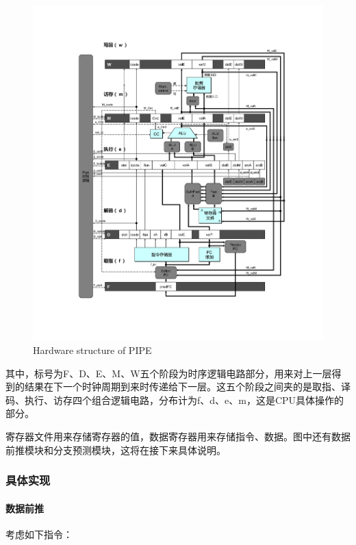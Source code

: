 \begin{figure}[htbp]
\centering
\includegraphics{img/pipe-full.png}
\caption{Hardware structure of PIPE}
\end{figure}

其中，标号为F、D、E、M、W五个阶段为时序逻辑电路部分，用来对上一层得到的结果在下一个时钟周期到来时传递给下一层。这五个阶段之间夹的是取指、译码、执行、访存四个组合逻辑电路，分布计为f、d、e、m，这是CPU具体操作的部分。

寄存器文件用来存储寄存器的值，数据寄存器用来存储指令、数据。图中还有数据前推模块和分支预测模块，这将在接下来具体说明。

\subsubsection{具体实现}\label{ux5177ux4f53ux5b9eux73b0}

\paragraph{数据前推}\label{ux6570ux636eux524dux63a8}

考虑如下指令：


